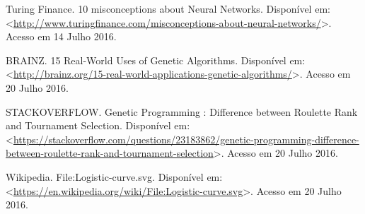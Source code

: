 \documentclass[12pt,a4paper]{article}
\begin{document}
	Turing Finance. 10 misconceptions about Neural Networks. Disponível em: \textless \url{http://www.turingfinance.com/misconceptions-about-neural-networks/}\textgreater. Acesso em 14 Julho 2016.\par
	BRAINZ. 15 Real-World Uses of Genetic Algorithms. Disponível em: \textless \url{http://brainz.org/15-real-world-applications-genetic-algorithms/}\textgreater. Acesso em 20 Julho 2016.\par
	STACKOVERFLOW. Genetic Programming : Difference between Roulette Rank and Tournament Selection. Disponível em: \textless \url{https://stackoverflow.com/questions/23183862/genetic-programming-difference-between-roulette-rank-and-tournament-selection}\textgreater. Acesso em 20 Julho 2016.\par
	Wikipedia. File:Logistic-curve.svg. Disponível em: \textless \url{https://en.wikipedia.org/wiki/File:Logistic-curve.svg}\textgreater. Acesso em 20 Julho 2016.\par
\end{document}
